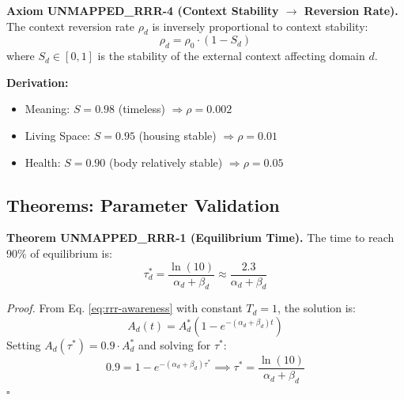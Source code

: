 \begin{tcolorbox}[colback=red!5!white, colframe=red!75!black, title=Axiom UNMAPPED_RRR-4: Context Stability]
\textbf{Axiom UNMAPPED_RRR-4 (Context Stability $\rightarrow$ Reversion Rate).}
The context reversion rate $\rho_d$ is inversely proportional to context stability:
\begin{equation}
\rho_d = \rho_0 \cdot (1 - S_d)
\end{equation}
where $S_d \in [0,1]$ is the stability of the external context affecting domain $d$.

\textbf{Derivation:}
\begin{itemize}[nosep]
\item Meaning: $S = 0.98$ (timeless) $\Rightarrow \rho = 0.002$
\item Living Space: $S = 0.95$ (housing stable) $\Rightarrow \rho = 0.01$
\item Health: $S = 0.90$ (body relatively stable) $\Rightarrow \rho = 0.05$
\end{itemize}
\end{tcolorbox}

\subsection{Theorems: Parameter Validation}

\begin{tcolorbox}[colback=green!5!white, colframe=green!75!black, title=Theorem UNMAPPED_RRR-1: Equilibrium Time Formula]
\textbf{Theorem UNMAPPED_RRR-1 (Equilibrium Time).}
The time to reach 90\% of equilibrium is:
\begin{equation}
\tau_d^* = \frac{\ln(10)}{\alpha_d + \beta_d} \approx \frac{2.3}{\alpha_d + \beta_d}
\end{equation}

\textit{Proof.}
From Eq. \eqref{eq:rrr-awareness} with constant $T_d = 1$, the solution is:
\begin{equation}
A_d(t) = A_d^* \left(1 - e^{-(\alpha_d + \beta_d)t}\right)
\end{equation}
Setting $A_d(\tau^*) = 0.9 \cdot A_d^*$ and solving for $\tau^*$:
\begin{equation}
0.9 = 1 - e^{-(\alpha_d + \beta_d)\tau^*} \implies \tau^* = \frac{\ln(10)}{\alpha_d + \beta_d}
\end{equation}
\hfill $\square$
\end{tcolorbox}

